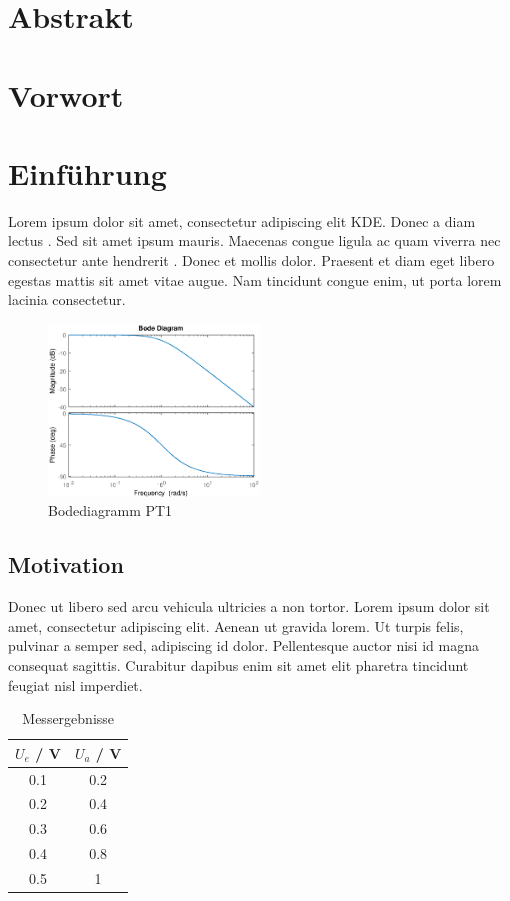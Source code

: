 \documentclass[a4paper,12pt]{article}
\begin{document}
\section*{Abstrakt}
\newpage
\section*{Vorwort}
\newpage
{}
\tableofcontents
\newpage
\section{Einführung}
Lorem ipsum dolor sit amet, consectetur adipiscing elit \ac{KDE}. Donec a diam lectus \cite{Accardi.2010}. Sed sit amet ipsum mauris. Maecenas  congue ligula ac quam viverra nec consectetur ante hendrerit \cite{Lewis.2010}. Donec et mollis dolor. Praesent et diam eget libero egestas mattis sit amet vitae augue. Nam tincidunt congue enim, ut porta lorem lacinia consectetur. 

\begin{figure}[h]
\center \includegraphics[width=0.5\textwidth]{Bilder/PT1/PT1.eps}
\caption{Bodediagramm PT1}
\end{figure}

\subsection{Motivation}
Donec ut libero sed arcu vehicula ultricies a non tortor. Lorem ipsum dolor sit amet, consectetur adipiscing elit. Aenean ut gravida lorem. Ut turpis felis, pulvinar a semper sed, adipiscing id dolor. Pellentesque auctor nisi id magna consequat sagittis. Curabitur dapibus enim sit amet elit pharetra tincidunt feugiat nisl imperdiet.

\begin{table}[h]
	\center
	\begin{tabular}[h]{|c|c|}
		\hline
		$U_e$ / V& $U_a$ / V\\ \hline
		0.1 & 0.2 \\ \hline
		0.2 & 0.4 \\ \hline
		0.3 & 0.6 \\ \hline
		0.4 & 0.8 \\ \hline
		0.5 & 1 \\ \hline
	\end{tabular}
	\caption{Messergebnisse}
\end{table}
\end{document}
